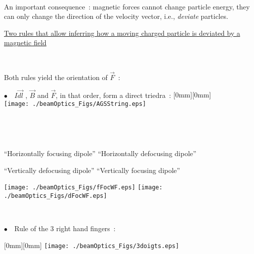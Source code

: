 \documentclass[12pt]{paper}
\newcommand{\B}{\ensuremath{\vec B}}
\newcommand{\F}{\ensuremath{\vec F}}
\newcommand{\nib}{\noindent $\bullet$~}
\newcommand{\blue}{\color{blue}}
\begin{document}
~

{\blue An important consequence~:  magnetic forces cannot change particle energy, they can only 
change the direction of the velocity vector, i.e., \textsl{deviate} particles. }






\clearpage 


\underline{Two rules that allow inferring how a moving charged particle is deviated by a magnetic field }

~

Both  rules  yield the orientation of $\F$~: 


{\blue \nib\  $I\vec{dl}$ , $\B$ and $\F$, in that order, form a direct triedra~: }
\raisebox{-10mm}[0mm][0mm]{ ~  ~  ~  ~  \texttt{[image: ./beamOptics\_Figs/AGSString.eps]}}

~

~

{\centering

\hfill ``Horizontally focusing dipole''   \hfill   ``Horizontally defocusing  dipole'' \hfill ~

\hfill ``Vertically defocusing dipole''   \hfill   ``Vertically focusing  dipole'' \hfill ~

\texttt{[image: ./beamOptics\_Figs/fFocWF.eps]}\hspace{30mm}
\texttt{[image: ./beamOptics\_Figs/dFocWF.eps]} 


\begin{minipage}[b]{.4\linewidth}

~

\vspace{30mm}

{\blue \nib\ Rule of the 3 right hand fingers~: }


\end{minipage}
\begin{minipage}[b]{.49\linewidth}
\raisebox{-30mm}[0mm][0mm]{
\texttt{[image: ./beamOptics\_Figs/3doigts.eps]} 
}

\end{minipage}

}%
\end{document}

